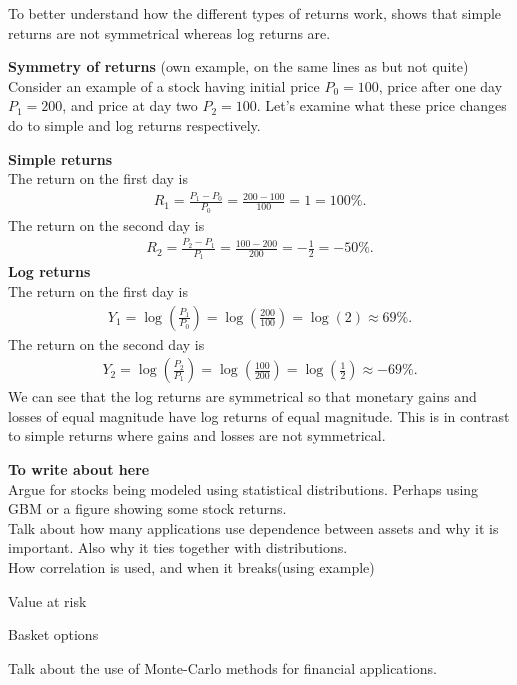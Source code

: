To better understand how the different types of returns work,  shows that simple returns are not symmetrical whereas log returns are. 
\begin{example}\label{ex:returnSymmetry}
    \textbf{Symmetry of returns} (own example, on the same lines as \citet[p.~4]{Danielsson2011} but not quite)
    Consider an example of a stock having initial price $P_0 = 100$, price after one day $P_1 = 200$, and price at day two $P_2 = 100$. Let's examine what these price changes do to simple and log returns respectively.
    
    \textbf{Simple returns}\\
    The return on the first day is
    \begin{align*}
        R_1 = \frac{P_1-P_0}{P_0} = \frac{200-100}{100} = 1 = 100\%.
    \end{align*}
    The return on the second day is
    \begin{align*}
        R_2 = \frac{P_2-P_1}{P_1} = \frac{100-200}{200} = -\frac{1}{2} = -50\%.
    \end{align*}    
    \textbf{Log returns}\\
    The return on the first day is 
    \begin{align*}
       Y_1 = \log \left( \frac{P_1}{P_0}\right) = \log\left(\frac{200}{100}\right)  = \log(2) \approx 69 \%.
    \end{align*}
    The return on the second day is
    \begin{align*}
        Y_2 = \log\left(\frac{P_2}{P_1}\right) = \log\left(\frac{100}{200}\right)= \log\left(\frac{1}{2}\right) \approx -69\%.
    \end{align*}
    We can see that the log returns are symmetrical so that monetary gains and losses of equal magnitude have log returns of equal magnitude. This is in contrast to simple returns where gains and losses are not symmetrical.
\end{example}


\begin{generalinstructions}
    \textbf{To write about here}\\
    Argue for stocks being modeled using statistical distributions. Perhaps using GBM or a figure showing some stock returns.\\
    Talk about how many applications use dependence between assets and why it is important. Also why it ties together with distributions.\\
    How correlation is used, and when it breaks(using example)
    \begin{compactitem}         
        \item Value at risk
        \item Basket options          
    \end{compactitem}
    Talk about the use of Monte-Carlo methods for financial applications. \\
\end{generalinstructions}





